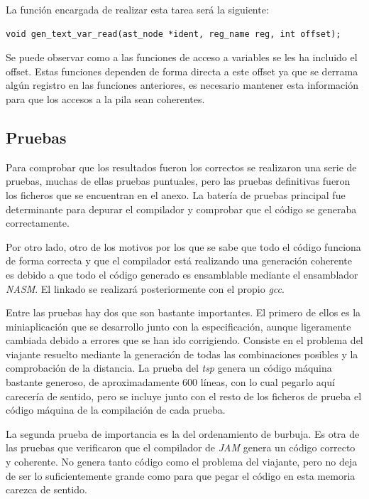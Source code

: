 \documentclass[a4paper,10pt]{article}
\begin{document}
\noindent La función encargada de realizar esta tarea será la siguiente:

\begin{lstlisting}
void gen_text_var_read(ast_node *ident, reg_name reg, int offset);
\end{lstlisting}

Se puede observar como a las funciones de acceso a variables se les ha incluido el offset. Estas funciones dependen de forma directa a este offset ya que se derrama algún registro en las funciones anteriores, es necesario mantener esta información para que los accesos a la pila sean coherentes.

\subsection{Pruebas}

Para comprobar que los resultados fueron los correctos se realizaron una serie de pruebas, muchas de ellas pruebas puntuales, pero las pruebas definitivas fueron los ficheros que se encuentran en el anexo. La batería de pruebas principal fue determinante para depurar el compilador y comprobar que el código se generaba correctamente.

Por otro lado, otro de los motivos por los que se sabe que todo el código funciona de forma correcta y que el compilador está realizando una generación coherente es debido a que todo el código generado es ensamblable mediante el ensamblador \textit{NASM}. El linkado se realizará posteriormente con el propio \textit{gcc}.

Entre las pruebas hay dos que son bastante importantes. El primero de ellos es la miniaplicación que se desarrollo junto con la especificación, aunque ligeramente cambiada debido a errores que se han ido corrigiendo. Consiste en el problema del viajante resuelto mediante la generación de todas las combinaciones posibles y la comprobación de la distancia. La prueba del \textit{tsp} genera un código máquina bastante generoso, de aproximadamente 600 líneas, con lo cual pegarlo aquí carecería de sentido, pero se incluye junto con el resto de los ficheros de prueba el código máquina de la compilación de cada prueba.

La segunda prueba de importancia es la del ordenamiento de burbuja. Es otra de las pruebas que verificaron que el compilador de \textit{JAM} genera un código correcto y coherente. No genera tanto código como el problema del viajante, pero no deja de ser lo suficientemente grande como para que pegar el código en esta memoria carezca de sentido.
\end{document}
